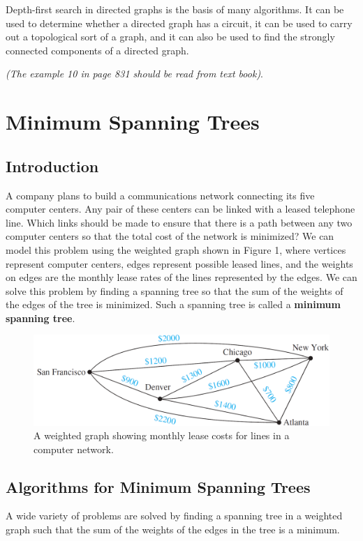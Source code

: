 \documentclass{article}
\begin{document}
Depth-first search in directed graphs is the basis of many algorithms. It can be used to determine whether a directed graph has a circuit, it can be used to carry out a topological sort of a graph, and it can also be used to find the strongly connected components of a directed graph.

\textit{(The example 10 in page 831 should be read from text book)}.


\section{Minimum Spanning Trees}
\setcounter{figure}{0}
\setcounter{algorithm}{0}

\subsection{Introduction}

A company plans to build a communications network connecting its five computer centers. Any pair of these centers can be linked with a leased telephone line. Which links should be made to ensure that there is a path between any two computer centers so that the total cost of the network is minimized? We can model this problem using the weighted graph shown in Figure 1, where vertices represent computer centers, edges represent possible leased lines, and the weights on edges are the monthly lease rates of the lines represented by the edges. We can solve this problem by finding a spanning tree so that the sum of the weights of the edges of the tree is minimized. Such a spanning tree is called a \textbf{minimum spanning tree}.

\begin{figure}[h!]
    \centering
    \includegraphics[width=.5\textwidth]{img/ch11.5-f1.png}
    \caption{A weighted graph showing monthly lease costs for lines in a computer network.}
    \label{fig:my_label}
\end{figure}

\subsection{Algorithms for Minimum Spanning Trees}

A wide variety of problems are solved by finding a spanning tree in a weighted graph such that the sum of the weights of the edges in the tree is a minimum.
\end{document}
